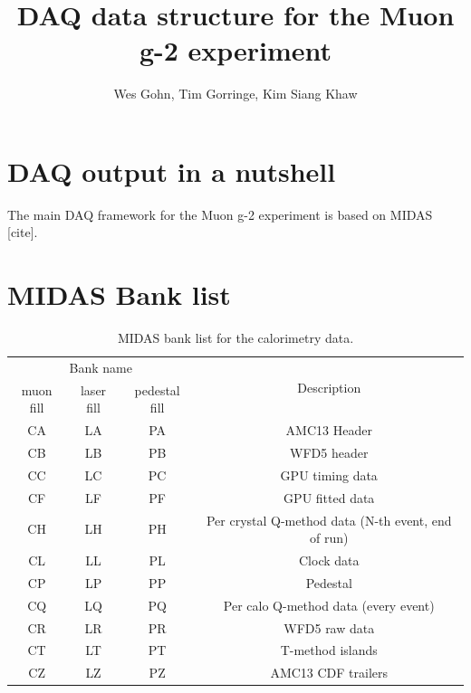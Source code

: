 

\author{Wes Gohn, Tim Gorringe, Kim Siang Khaw}
\title{DAQ data structure for the Muon g-2 experiment}


\maketitle


\section{DAQ output in a nutshell}
The main DAQ framework for the Muon g-2 experiment is based on MIDAS [cite]. 

\section{MIDAS Bank list}

\begin{table}[htbp]
\centering
\caption{MIDAS bank list for the calorimetry data.}
\begin{tabular}{|c|c|c|c|}
\hline 
\multicolumn{3}{|c|}{Bank name}  & \multirow{2}{*}{Description} \\ \cline{1-3}
muon fill& laser fill & pedestal fill & \\
\hline
CA & LA & PA & AMC13 Header \\ 
\hline 
CB & LB & PB & WFD5 header \\ 
\hline 
CC & LC & PC & GPU timing data \\ 
\hline 
CF & LF & PF & GPU fitted data \\ 
\hline 
CH & LH & PH & Per crystal Q-method data (N-th event, end of run) \\ 
\hline 
CL & LL & PL & Clock data \\ 
\hline 
CP & LP & PP & Pedestal\\ 
\hline 
CQ & LQ & PQ & Per calo Q-method data (every event) \\ 
\hline 
CR & LR & PR & WFD5 raw data \\ 
\hline 
CT & LT & PT & T-method islands \\ 
\hline 
CZ & LZ & PZ & AMC13 CDF trailers \\ 
\hline 
\end{tabular} 
\end{table}


